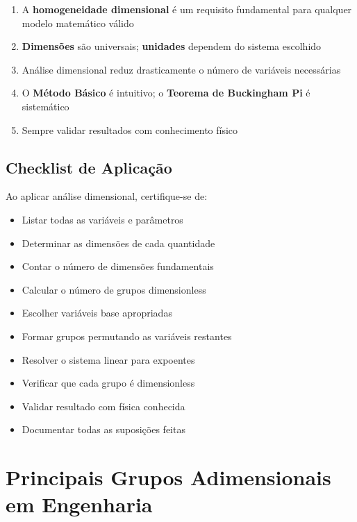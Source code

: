 \documentclass[12pt,a4paper,oneside]{book}
\theoremstyle{definition}
\begin{document}
\begin{enumerate}
    \item A \textbf{homogeneidade dimensional} é um requisito fundamental para qualquer modelo matemático válido
    \item \textbf{Dimensões} são universais; \textbf{unidades} dependem do sistema escolhido
    \item Análise dimensional reduz drasticamente o número de variáveis necessárias
    \item O \textbf{Método Básico} é intuitivo; o \textbf{Teorema de Buckingham Pi} é sistemático
    \item Sempre validar resultados com conhecimento físico
\end{enumerate}

\subsection{Checklist de Aplicação}

Ao aplicar análise dimensional, certifique-se de:

\begin{itemize}
    \item[$\square$] Listar todas as variáveis e parâmetros
    \item[$\square$] Determinar as dimensões de cada quantidade
    \item[$\square$] Contar o número de dimensões fundamentais
    \item[$\square$] Calcular o número de grupos dimensionless
    \item[$\square$] Escolher variáveis base apropriadas
    \item[$\square$] Formar grupos permutando as variáveis restantes
    \item[$\square$] Resolver o sistema linear para expoentes
    \item[$\square$] Verificar que cada grupo é dimensionless
    \item[$\square$] Validar resultado com física conhecida
    \item[$\square$] Documentar todas as suposições feitas
\end{itemize}

\section{Principais Grupos Adimensionais em Engenharia}
\end{document}
